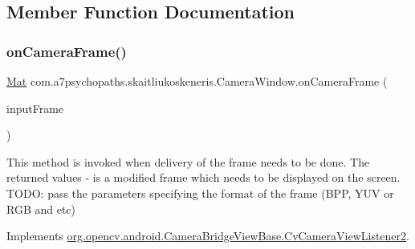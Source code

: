 \subsection{Member Function Documentation}
\mbox{\label{classcom_1_1a7psychopaths_1_1skaitliukoskeneris_1_1_camera_window_a2ee3840e4c61b7ab95e2dc3f6407aad0}} 
\subsubsection{\texorpdfstring{on\+Camera\+Frame()}{onCameraFrame()}}
{\footnotesize\ttfamily \mbox{\hyperlink{classorg_1_1opencv_1_1core_1_1_mat}{Mat}} com.\+a7psychopaths.\+skaitliukoskeneris.\+Camera\+Window.\+on\+Camera\+Frame (\begin{DoxyParamCaption}\item[{Camera\+Bridge\+View\+Base.\+Cv\+Camera\+View\+Frame}]{input\+Frame }\end{DoxyParamCaption})}

This method is invoked when delivery of the frame needs to be done. The returned values -\/ is a modified frame which needs to be displayed on the screen. T\+O\+DO\+: pass the parameters specifying the format of the frame (B\+PP, Y\+UV or R\+GB and etc) 

Implements \mbox{\hyperlink{interfaceorg_1_1opencv_1_1android_1_1_camera_bridge_view_base_1_1_cv_camera_view_listener2_aa8cf69267ec5580344728dbadbf6ae0f}{org.\+opencv.\+android.\+Camera\+Bridge\+View\+Base.\+Cv\+Camera\+View\+Listener2}}.

\mbox{\label{classcom_1_1a7psychopaths_1_1skaitliukoskeneris_1_1_camera_window_a204ec7def65b3ce5a29720b67b03a77c}} 

